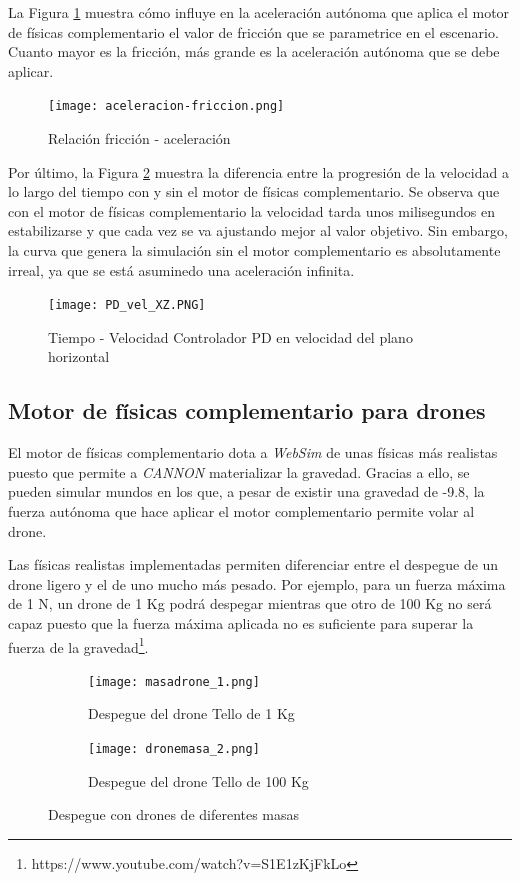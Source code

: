 La Figura \ref{fig:friccion-acele} muestra cómo influye en la aceleración autónoma que aplica el motor de físicas complementario el valor de fricción que se parametrice en el escenario. Cuanto mayor es la fricción, más grande es la aceleración autónoma que se debe aplicar.
\newpage
\begin{figure}[h!]
    \centering
    \texttt{[image: aceleracion-friccion.png]}
    \caption{Relación fricción - aceleración}
    \label{fig:friccion-acele}
\end{figure}

Por último, la Figura \ref{fig:vel-planoXZ} muestra la diferencia entre la progresión de la velocidad a lo largo del tiempo con y sin el motor de físicas complementario. Se observa que con el motor de físicas complementario la velocidad tarda unos milisegundos en estabilizarse y que cada vez se va ajustando mejor al valor objetivo. Sin embargo, la curva que genera la simulación sin el motor complementario es absolutamente irreal, ya que se está asuminedo una aceleración infinita.

\begin{figure}[h!]
    \centering
    \texttt{[image: PD\_vel\_XZ.PNG]}
    \caption{Tiempo - Velocidad Controlador PD en velocidad del plano horizontal}
    \label{fig:vel-planoXZ}
\end{figure}

\newpage
\subsection{Motor de físicas complementario para drones}
El motor de físicas complementario dota a \textit{WebSim} de unas físicas más realistas puesto que permite a \textit{CANNON} materializar la gravedad. Gracias a ello, se pueden simular mundos en los que, a pesar de existir una gravedad de -9.8, la fuerza autónoma que hace aplicar el motor complementario permite volar al drone. \newline

Las físicas realistas implementadas permiten diferenciar entre el despegue de un drone ligero y el de uno mucho más pesado. Por ejemplo, para un fuerza máxima de 1 N, un drone de 1 Kg podrá despegar mientras que otro de 100 Kg no será capaz puesto que la fuerza máxima aplicada no es suficiente para superar la fuerza de la gravedad\footnote{https://www.youtube.com/watch?v=S1E1zKjFkLo}.

\begin{figure}[h!]
  \centering
  \begin{subfigure}[b]{\textwidth}
    \texttt{[image: masadrone\_1.png]}
    \caption{Despegue del drone Tello de 1 Kg}
  \end{subfigure}
  \hfill
  \begin{subfigure}[b]{\textwidth}
    \texttt{[image: dronemasa\_2.png]}
    \caption{Despegue del drone Tello de 100 Kg}
  \end{subfigure}
\caption{Despegue con drones de diferentes masas}
\label{fig:masadrone}
\end{figure}



